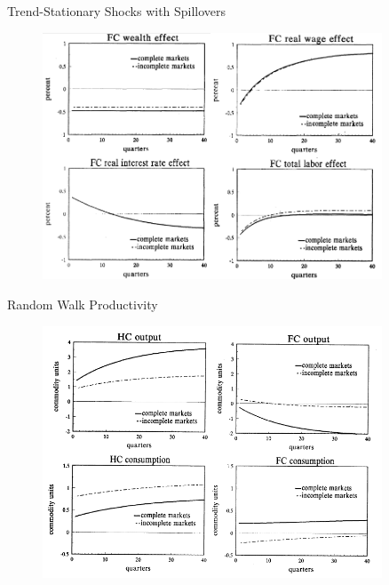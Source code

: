 \documentclass[10pt]{beamer}
\begin{document}
\begin{frame}{Trend-Stationary Shocks with Spillovers}
\begin{figure}[thbp]
  \centering
  \includegraphics[width=0.90\textwidth]{23.png}
\end{figure}
\end{frame}



\begin{frame}{Random Walk Productivity}
\begin{figure}[thbp]
  \centering
  \includegraphics[width=0.90\textwidth]{10.png}
\end{figure}
\end{frame}
\end{document}

